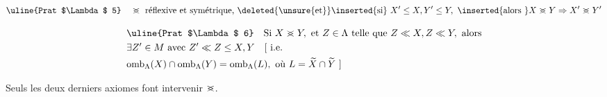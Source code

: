 \[
\text{\uline{Prat $\Lambda$ 5}}\quad\mathrel{>\mkern-13mu<}\ \text{réflexive et symétrique, \deleted{\unsure{et}}\inserted{si} }X'\leq X,Y'\leq Y,\ \inserted{\text{alors }}X\mathrel{>\mkern-13mu<}Y\Rightarrow X'\mathrel{>\mkern-13mu<}Y'
\]

\[
\begin{aligned}
&\text{\uline{Prat $\Lambda$ 6}}\quad \text{Si } X\mathrel{>\mkern-13mu<}Y,\ \text{et }Z\in\Lambda\ \text{telle que }Z\ll X,Z\ll Y,\ \text{alors}\\
&\exists Z'\in M\ \text{avec } Z'\ll Z\leq X,Y\quad [\ \text{i.e.}\\
&\mathrm{omb}_{\Lambda}(X)\cap\mathrm{omb}_{\Lambda}(Y)=\mathrm{omb}_{\Lambda}(L),\ \text{où }L=\widetilde X\cap\widetilde Y\ ]
\end{aligned}
\]



Seuls les deux derniers axiomes font intervenir $\mathrel{>\mkern-13mu<}$.

